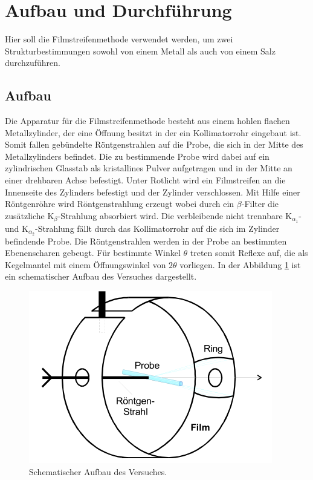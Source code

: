 \newpage
\section{Aufbau und Durchführung}
\label{sec:Durchführung}
Hier soll die Filmstreifenmethode verwendet werden,
um zwei Strukturbestimmungen
sowohl von einem Metall als auch von
einem Salz durchzuführen.
\subsection{Aufbau}
\label{subsec:Aufbau}
Die Apparatur für die Filmstreifenmethode
besteht aus einem hohlen flachen Metallzylinder,
der eine Öffnung besitzt
in der ein Kollimatorrohr eingebaut ist.
Somit fallen gebündelte Röntgenstrahlen auf
 die Probe, die sich in
der Mitte des Metallzylinders befindet.
Die zu bestimmende Probe wird dabei auf ein
zylindrischen Glasstab
als kristallines Pulver aufgetragen und in der Mitte an einer drehbaren
Achse befestigt. Unter Rotlicht wird ein Filmstreifen an die Innenseite
des Zylinders befestigt und der Zylinder verschlossen.
Mit Hilfe einer Röntgenröhre wird Röntgenstrahlung erzeugt
wobei durch ein $\beta$-Filter die zusätzliche
$\mathrm{K}_\beta$-Strahlung absorbiert wird.
Die verbleibende nicht trennbare  $\mathrm{K}_{\alpha_1}$-
und $\mathrm{K}_{\alpha_2}$-Strahlung fällt durch das Kollimatorrohr
auf die sich im Zylinder befindende Probe. Die Röntgenstrahlen werden in
der Probe an bestimmten Ebenenscharen gebeugt. Für bestimmte Winkel $\theta$ treten
somit Reflexe auf, die als Kegelmantel mit einem Öffnungswinkel von $2\theta$
vorliegen. In der Abbildung \ref{fig:aufbau} ist ein schematischer Aufbau des Versuches dargestellt.
\begin{figure}
  \centering
  \includegraphics{Aufbau.PNG}
  \caption{Schematischer Aufbau des Versuches.\cite{sample}}
  \label{fig:aufbau}
 \end{figure}
\FloatBarrier
